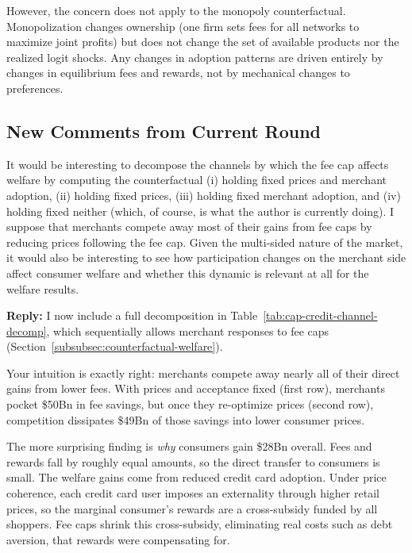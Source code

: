 \documentclass[main.tex]{subfiles}
\begin{document}
\begin{refsection}
However, the concern does not apply to the monopoly counterfactual. Monopolization changes ownership (one firm sets fees for all networks to maximize joint profits) but does not change the set of available products nor the realized logit shocks.
Any changes in adoption patterns are driven entirely by changes in equilibrium fees and rewards, not by mechanical changes to preferences.

\subsection*{New Comments from Current Round}

\begin{refcommentnoclear}
It would be interesting to decompose the channels by which the fee cap affects welfare by computing the counterfactual (i) holding fixed prices and merchant adoption, (ii) holding fixed prices, (iii) holding fixed merchant adoption, and (iv) holding fixed neither (which, of course, is what the author is currently doing).
I suppose that merchants compete away most of their gains from fee caps by reducing prices following the fee cap.
Given the multi-sided nature of the market, it would also be interesting to see how participation changes on the merchant side affect consumer welfare and whether this dynamic is relevant at all for the welfare results.

\end{refcommentnoclear}

\textbf{Reply:} I now include a full decomposition in Table~\ref{tab:cap-credit-channel-decomp}, which sequentially allows merchant responses to fee caps (Section~\ref{subsubsec:counterfactual-welfare}).

Your intuition is exactly right: merchants compete away nearly all of their direct gains from lower fees.
With prices and acceptance fixed (first row), merchants pocket \$50Bn in fee savings, but once they re-optimize prices (second row), competition dissipates \$49Bn of those savings into lower consumer prices.

The more surprising finding is \emph{why} consumers gain \$28Bn overall.
Fees and rewards fall by roughly equal amounts, so the direct transfer to consumers is small.
The welfare gains come from reduced credit card adoption. 
Under price coherence, each credit card user imposes an externality through higher retail prices, so the marginal consumer's rewards are a cross-subsidy funded by all shoppers.
Fee caps shrink this cross-subsidy, eliminating real costs such as debt aversion, that rewards were compensating for.


\end{refsection}
\end{document}
